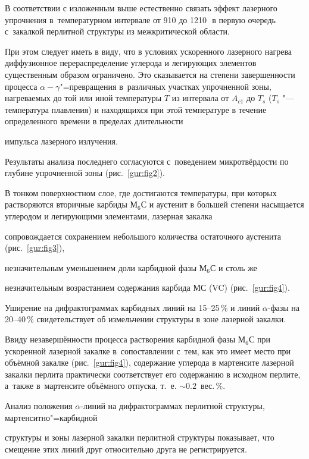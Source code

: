 


В соответствии с изложенным выше естественно связать эффект лазерного упрочнения в~температурном интервале от 910 до 1210\,\textcelsius\ в первую очередь с~закалкой перлитной структуры из межкритической области. 

При этом следует иметь в виду, что в условиях ускоренного лазерного нагрева диффузионное перераспределение углерода и легирующих элементов существенным образом ограничено. Это сказывается на степени завершенности процесса ${\alpha -\gamma} $"=превращения в~различных участках упрочненной зоны, нагреваемых до той или иной температуры $T$ из интервала от $A_{c1}$ до $T_s$ ($T_s$ "--- температура плавления) и находящихся при этой температуре в течение определенного времени в пределах длительности

импульса лазерного излучения. 

Результаты анализа последнего согласуются с~поведением микротвёрдости по глубине упрочненной зоны (рис.~\ref{gur:fig2}).







В тонком поверхностном слое, где достигаются температуры, при которых растворяются вторичные карбиды М$_6$С и аустенит в большей степени насыщается углеродом и легирующими элементами, лазерная закалка

сопровождается сохранением небольшого количества остаточного аустенита (рис.~\ref{gur:fig3}),

незначительным уменьшением доли карбидной фазы М$_{6}$С и столь же

незначительным возрастанием содержания карбида МС (VC) (рис.~\ref{gur:fig4}). 

Уширение на дифрактограммах карбидных линий на 15--25\,\% и линий $\alpha $-фазы на 20--40\,\% свидетельствует об измельчении структуры в зоне лазерной закалки. 

Ввиду незавершённости процесса растворения карбидной фазы М$_{6}$С при ускоренной лазерной закалке в~сопоставлении с~тем, как это имеет место при объёмной закалке (рис.~\ref{gur:fig4}), содержание углерода в мартенсите лазерной закалки перлита практически соответствует его содержанию в исходном перлите, а~также в~мартенсите объёмного отпуска, т.~е. $\sim  0.2$~вес.\,\%. 

Анализ положения $\alpha $-линий на дифрактограммах перлитной структуры, мартенситно"=карбидной

структуры и зоны лазерной закалки перлитной структуры показывает, что смещение этих линий друг относительно друга не регистрируется. 

